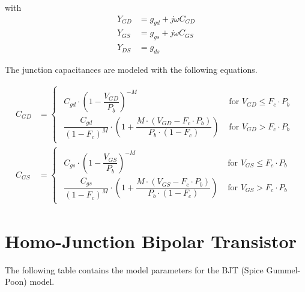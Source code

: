 \documentclass[10pt]{report}
\begin{document}
with
\begin{align}
Y_{GD} &= g_{gd} + j\omega C_{GD}\\
Y_{GS} &= g_{gs} + j\omega C_{GS}\\
Y_{DS} &= g_{ds}
\end{align}

The junction capacitances are modeled with the following equations.

\begin{align}
C_{GD} &= 
\begin{cases}
\begin{array}{ll}
C_{gd}\cdot \left(1 - \dfrac{V_{GD}}{P_{b}}\right)^{-M} & \textrm{ for } V_{GD} \le F_{c}\cdot P_{b}\\
\dfrac{C_{gd}}{\left(1 - F_{c}\right)^{M}}\cdot \left(1 + \dfrac{M\cdot \left(V_{GD} - F_{c}\cdot P_{b}\right)}{P_{b}\cdot \left(1 - F_{c}\right)}\right) & \textrm{ for } V_{GD} > F_{c}\cdot P_{b}
\end{array}
\end{cases}\\
C_{GS} &= 
\begin{cases}
\begin{array}{ll}
C_{gs}\cdot \left(1 - \dfrac{V_{GS}}{P_{b}}\right)^{-M} & \textrm{ for } V_{GS} \le F_{c}\cdot P_{b}\\
\dfrac{C_{gs}}{\left(1 - F_{c}\right)^{M}}\cdot \left(1 + \dfrac{M\cdot \left(V_{GS} - F_{c}\cdot P_{b}\right)}{P_{b}\cdot \left(1 - F_{c}\right)}\right) & \textrm{ for } V_{GS} > F_{c}\cdot P_{b}
\end{array}
\end{cases}
\end{align}

\section{Homo-Junction Bipolar Transistor}

The following table contains the model parameters for the BJT (Spice
Gummel-Poon) model.

\addvspace{12pt}
\end{document}

